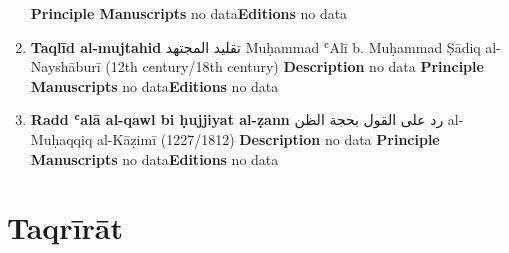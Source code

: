 \documentclass{article}
\begin{document}
\begin{enumerate}
        \newline
        \newline
    \textbf{Principle Manuscripts}
\newline
no data\newline\textbf{Editions}
\newline
no data\newline
      \item \textbf{Taqlīd al-mujtahid}
        \newline
        \textarabic{تقليد المجتهد}
        \newline
        Muḥammad ʿAlī b. Muḥammad Ṣādiq al-Nayshāburī
        \newline
        (12th century/18th century)
        \newline
        \newline
        \textbf{Description}
        \newline	
        no data
        \newline
        \newline
    \textbf{Principle Manuscripts}
\newline
no data\newline\textbf{Editions}
\newline
no data\newline
      \item \textbf{Radd ʿalā al-qawl bi ḥujjiyat al-ẓann}
        \newline
        \textarabic{رد علی القول بحجة الظن}
        \newline
        al-Muḥaqqiq al-Kāẓimī
        \newline
        (1227/1812)
        \newline
        \newline
        \textbf{Description}
        \newline	
        no data
        \newline
        \newline
    \textbf{Principle Manuscripts}
\newline
no data\newline\textbf{Editions}
\newline
no data\newline\end{enumerate}\section{Taqrīrāt}
\end{document}
